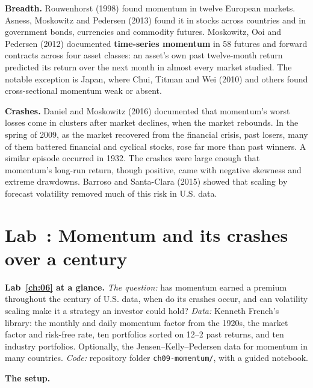 \textbf{Breadth.} Rouwenhorst (1998) found momentum in twelve European markets. Asness, Moskowitz and Pedersen (2013) found it in stocks across countries and in government bonds, currencies and commodity futures. Moskowitz, Ooi and Pedersen (2012) documented \textbf{time-series momentum} in 58 futures and forward contracts across four asset classes: an asset's own past twelve-month return predicted its return over the next month in almost every market studied. The notable exception is Japan, where Chui, Titman and Wei (2010) and others found cross-sectional momentum weak or absent.

\textbf{Crashes.} Daniel and Moskowitz (2016) documented that momentum's worst losses come in clusters after market declines, when the market rebounds. In the spring of 2009, as the market recovered from the financial crisis, past losers, many of them battered financial and cyclical stocks, rose far more than past winners. A similar episode occurred in 1932. The crashes were large enough that momentum's long-run return, though positive, came with negative skewness and extreme drawdowns. Barroso and Santa-Clara (2015) showed that scaling by forecast volatility removed much of this risk in U.S. data.

\section{Lab~\thechapter: Momentum and its crashes over a century}
\label{sec:06-lab}

\begin{callout}
\textbf{Lab~\ref{ch:06} at a glance.} \emph{The question:} has momentum earned a premium throughout the century of U.S. data, when do its crashes occur, and can volatility scaling make it a strategy an investor could hold? \emph{Data:} Kenneth French's library: the monthly and daily momentum factor from the 1920s, the market factor and risk-free rate, ten portfolios sorted on 12--2 past returns, and ten industry portfolios. Optionally, the Jensen--Kelly--Pedersen data for momentum in many countries. \emph{Code:} repository folder \texttt{ch09-momentum/}, with a guided notebook.
\end{callout}

\textbf{The setup.}

